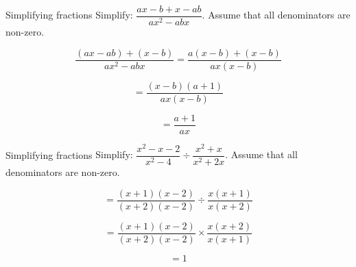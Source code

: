 \begin{wex}{Simplifying fractions }{Simplify: $\dfrac{ax-b+x-ab}{a{x}^{2}-abx}$. Assume that all denominators are non-zero.}{

\begin{equation*}
  \dfrac{(ax-ab)+(x-b)}{a{x}^{2}-abx} = \dfrac{a(x-b)+(x-b)}{ax(x-b)}
\end{equation*}

\begin{equation*}
  = \dfrac{(x-b)(a+1)}{ax(x-b)}
\end{equation*}

\begin{equation*}
  = \dfrac{a+1}{ax}
\end{equation*}
}
\end{wex}


\begin{wex}{Simplifying fractions}
{Simplify: $\dfrac{{x}^{2}-x-2}{{x}^{2}-4}÷\dfrac{{x}^{2}+x}{{x}^{2}+2x}$. Assume that all denominators are non-zero.}{
\begin{equation*}
  = \dfrac{(x+1)(x-2)}{(x+2)(x-2)}÷\dfrac{x(x+1)}{x(x+2)}
\end{equation*}

\begin{equation*}
  = \dfrac{(x+1)(x-2)}{(x+2)(x-2)}\ensuremath{\times}\dfrac{x(x+2)}{x(x+1)}
\end{equation*}

\begin{equation*}
  = 1
\end{equation*}
}
\end{wex}

